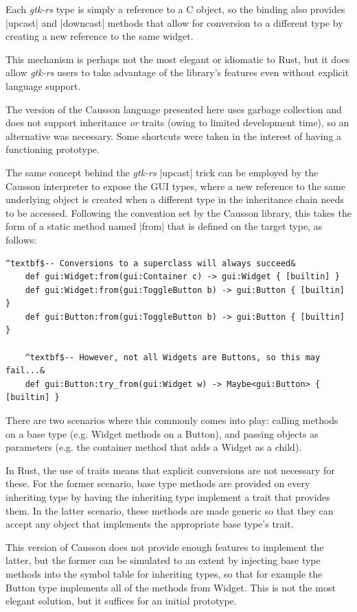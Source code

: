 \documentclass[11pt]{report}
\begin{document}
Each \emph{gtk-rs} type is simply a reference to a C object, so the binding also provides |upcast| and |downcast| methods that allow for conversion to a different type by creating a new reference to the same widget.

This mechanism is perhaps not the most elegant or idiomatic to Rust, but it does allow \emph{gtk-rs} users to take advantage of the library's features even without explicit language support.

The version of the Causson language presented here uses garbage collection and does not support inheritance \emph{or} traits (owing to limited development time), so an alternative was necessary. Some shortcuts were taken in the interest of having a functioning prototype.

The same concept behind the \emph{gtk-rs} |upcast| trick can be employed by the Causson interpreter to expose the GUI types, where a new reference to the same underlying object is created when a different type in the inheritance chain needs to be accessed. Following the convention set by the Causson library, this takes the form of a static method named |from| that is defined on the target type, as follows:

\begin{Verbatim}[commandchars=^$&]
    ^textbf$-- Conversions to a superclass will always succeed&
    def gui:Widget:from(gui:Container c) -> gui:Widget { [builtin] }
    def gui:Widget:from(gui:ToggleButton b) -> gui:Button { [builtin] }
    def gui:Button:from(gui:ToggleButton b) -> gui:Button { [builtin] }
    
    ^textbf$-- However, not all Widgets are Buttons, so this may fail...&
    def gui:Button:try_from(gui:Widget w) -> Maybe<gui:Button> { [builtin] }
\end{Verbatim}

There are two scenarios where this commonly comes into play: calling methods on a base type (e.g. Widget methods on a Button), and passing objects as parameters (e.g. the container method that adds a Widget as a child).

In Rust, the use of traits means that explicit conversions are not necessary for these. For the former scenario, base type methods are provided on every inheriting type by having the inheriting type implement a trait that provides them. In the latter scenario, these methods are made generic so that they can accept any object that implements the appropriate base type's trait.

This version of Causson does not provide enough features to implement the latter, but the former can be simulated to an extent by injecting base type methods into the symbol table for inheriting types, so that for example the Button type implements all of the methods from Widget. This is not the most elegant solution, but it suffices for an initial prototype.
\end{document}
